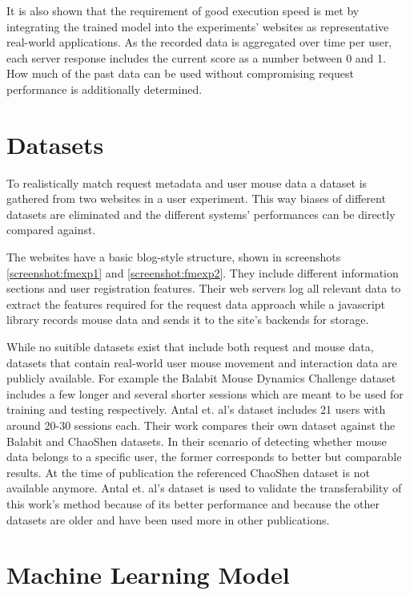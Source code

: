 \documentclass[
    fontsize=12pt,
    headings=small,
    parskip=half,           %
    bibliography=totoc,
    numbers=noenddot,       %
    open=any,               %
    final,                   %
    table
]{scrreprt}
\begin{document}
It is also shown that the requirement of good execution speed is met by integrating the trained model into the experiments' websites as representative real-world applications. As the recorded data is aggregated over time per user, each server response includes the current score as a number between 0 and 1. How much of the past data can be used without compromising request performance is additionally determined.

\section{Datasets}

To realistically match request metadata and user mouse data a dataset is gathered from two websites in a user experiment. This way biases of different datasets are eliminated and the different systems' performances can be directly compared against.

The websites have a basic blog-style structure, shown in screenshots \ref{screenshot:fmexp1} and \ref{screenshot:fmexp2}. They include different information sections and user registration features. Their web servers log all relevant data to extract the features required for the request data approach while a javascript library records mouse data and sends it to the site's backends for storage.

While no suitible datasets exist that include both request and mouse data, datasets that contain real-world user mouse movement and interaction data are publicly available. For example the Balabit Mouse Dynamics Challenge dataset \cite{BALABIT_CHALLENGE} includes a few longer and several shorter sessions which are meant to be used for training and testing respectively.
Antal et. al's dataset \cite{9111596} includes 21 users with around 20-30 sessions each. Their work compares their own dataset against the Balabit and ChaoShen datasets. In their scenario of detecting whether mouse data belongs to a specific user, the former corresponds to better but comparable results.
At the time of publication the referenced ChaoShen dataset is not available anymore. Antal et. al's dataset is used to validate the transferability of this work's method because of its better performance and because the other datasets are older and have been used more in other publications.


\section{Machine Learning Model}
\end{document}

